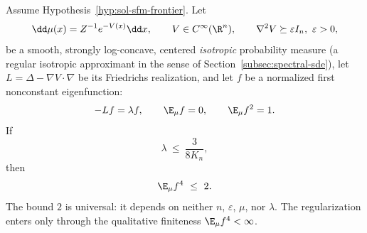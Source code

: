 \documentclass[../main.tex]{subfiles}
\begin{document}
\begin{theorem}
\label{thm:sol-lem-mm-smallgap-fourth-moment}
Assume Hypothesis~\ref{hyp:sol-sfm-frontier}.  Let
\[
  \dd\mu(x)=Z^{-1}e^{-V(x)}\dd x,
  \qquad V\in C^\infty(\R^n),\qquad\nabla^2V\succeq\varepsilon I_n,\ \varepsilon>0,
\]
be a smooth, strongly log-concave, centered \emph{isotropic} probability measure (a
regular isotropic approximant in the sense of Section~\ref{subsec:spectral-sde}), let
$L=\Delta-\nabla V\cdot\nabla$ be its Friedrichs realization, and let $f$ be a
normalized first nonconstant eigenfunction:
\[
  -Lf=\lambda f,\qquad\E_\mu f=0,\qquad\E_\mu f^2=1 .
\]
If
\[
  \lambda\ \le\ \frac{3}{8K_n},
\]
then
\begin{equation}
  \E_\mu f^4\ \le\ 2 .
  \label{eq:sol-sfm-main}
\end{equation}
The bound $2$ is universal: it depends on neither $n$, $\varepsilon$, $\mu$, nor
$\lambda$.  The regularization enters only through the qualitative finiteness
$\E_\mu f^4<\infty$.
\end{theorem}
\end{document}
